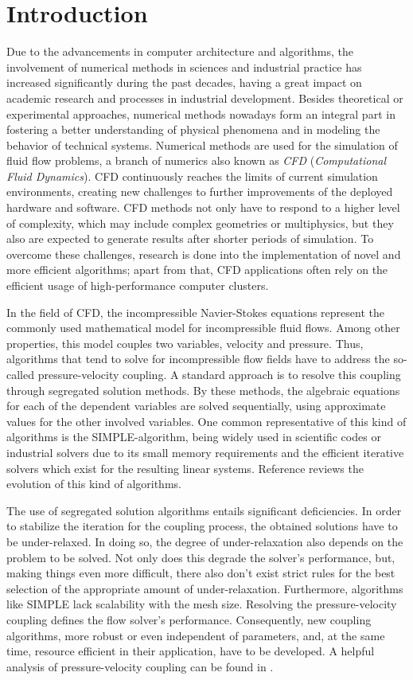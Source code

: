 \section{Introduction}

Due to the advancements in computer architecture and algorithms, the involvement of numerical methods in sciences and industrial practice has increased significantly during the past decades, having a great impact on academic research and processes in industrial development. Besides theoretical or experimental approaches, numerical methods nowadays form an integral part in fostering a better understanding of physical phenomena and in modeling the behavior of technical systems. Numerical methods are used for the simulation of fluid flow problems, a branch of numerics also known as \emph{CFD} (\emph{Computational Fluid Dynamics}). CFD continuously reaches the limits of current simulation environments, creating new challenges to further improvements of the deployed hardware and software. CFD methods not only have to respond to a higher level of complexity, which may include complex geometries or multiphysics, but they also are expected to generate results after shorter periods of simulation. To overcome these challenges, research is done into the implementation of novel and more efficient algorithms; apart from that, CFD applications often rely on the efficient usage of high-performance computer clusters. 

In the field of CFD, the incompressible Navier-Stokes equations represent the commonly used mathematical model for incompressible fluid flows. Among other properties, this model couples two variables, velocity and pressure. Thus, algorithms that tend to solve for incompressible flow fields have to address the so-called pressure-velocity coupling. A standard approach is to resolve this coupling through segregated solution methods. By these methods, the algebraic equations for each of the dependent variables are solved sequentially, using approximate values for the other involved variables. One common representative of this kind of algorithms is the SIMPLE-algorithm, being widely used in scientific codes or industrial solvers due to its small memory requirements and the efficient iterative solvers which exist for the resulting linear systems. Reference \cite{acharya07} reviews the evolution of this kind of algorithms.

The use of segregated solution algorithms entails significant deficiencies. In order to stabilize the iteration for the coupling process, the obtained solutions have to be under-relaxed. In doing so, the degree of under-relaxation also depends on the problem to be solved. Not only does this degrade the solver's performance, but, making things even more difficult, there also don't exist strict rules for the best selection of the appropriate amount of under-relaxation. Furthermore, algorithms like SIMPLE lack scalability with the mesh size. Resolving the pressure-velocity coupling defines the flow solver's performance. Consequently, new coupling algorithms, more robust or even independent of parameters, and, at the same time, resource efficient in their application, have to be developed. A helpful analysis of pressure-velocity coupling can be found in \cite{peric90}.

